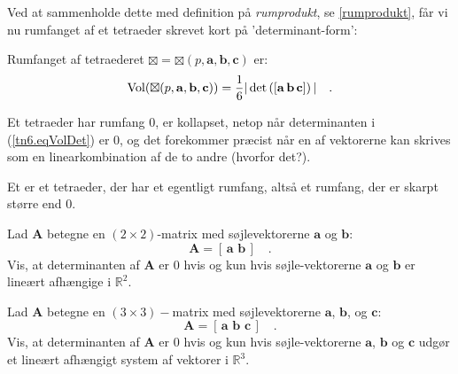 Ved at sammenholde dette med definition på \textit{rumprodukt}, se \ref{rumprodukt}, får vi nu rumfanget af et tetraeder skrevet kort på 'determinant-form':

\begin{theorem}
Rumfanget af tetraederet $\boxtimes = \boxtimes(p,\mathbf{a}, \mathbf{b}, \mathbf{c})$ er:
\begin{equation} \label{tn6.eqVolDet}
\operatorname{Vol}(\boxtimes(p,\mathbf{a}, \mathbf{b}, \mathbf{c})) = \frac{1}{6}| \det\left( \left[\mathbf{a} \, \mathbf{b} \, \mathbf{c}
               \right]
  \right) | \quad.\\
\end{equation}
 \end{theorem}

Et tetraeder har rumfang $0$, er kollapset, netop når determinanten i (\ref{tn6.eqVolDet}) er $0$, og det forekommer præcist når en af vektorerne kan skrives som en linearkombination af de to andre (hvorfor det?).

\begin{definition}
Et  er et tetraeder, der har et egentligt rumfang, altså et rumfang, der er skarpt større end $0$.
\end{definition}

\begin{exercise}
Lad $\mathbf{A}$ betegne en $(2 \times 2)$-matrix med søjlevektorerne $\mathbf{a}$ og $\mathbf{b}$:
\begin{equation}
\mathbf{A} = [\, \mathbf{a} \,\, \mathbf{b} \,] \quad.
\end{equation}
Vis, at determinanten af $\mathbf{A}$ er $0$ hvis og kun hvis søjle-vektorerne $\mathbf{a}$ og $\mathbf{b}$ er lineært afhængige i $\mathbb{R}^{2}$.
\end{exercise}

\begin{exercise}
Lad $\mathbf{A}$ betegne en $(3 \times 3)-$matrix med søjlevektorerne $\mathbf{a}$, $\mathbf{b}$, og $\mathbf{c}$:
\begin{equation}
\mathbf{A} = [\, \mathbf{a} \,\, \mathbf{b}\,\, \mathbf{c} \,] \quad.
\end{equation}
Vis, at determinanten af $\mathbf{A}$ er $0$ hvis og kun hvis søjle-vektorerne $\mathbf{a}$, $\mathbf{b}$ og  $\mathbf{c}$ udgør et lineært afhængigt system af vektorer i $\mathbb{R}^{3}$.
\end{exercise}

